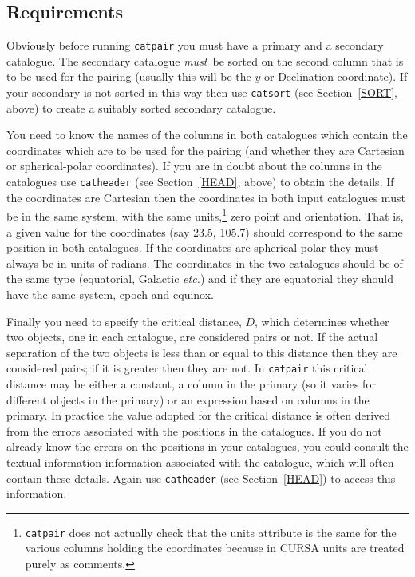 \documentclass[twoside,11pt]{starlink}
\begin{document}
\subsection{Requirements}

Obviously before running \texttt{catpair} you must have a primary and a
secondary catalogue. The secondary catalogue \textit{must}\, be sorted on
the second column that is to be used for the pairing (usually this will
be the $y$ or Declination coordinate). If your secondary is not sorted
in this way then use \texttt{catsort} (see Section~\ref{SORT}, above) to
create a suitably sorted secondary catalogue.

You need to know the names of the columns in both catalogues which
contain the coordinates which are to be used for the pairing (and whether
they are Cartesian or spherical-polar coordinates). If you are in doubt
about the columns in the catalogues use \texttt{catheader} (see
Section~\ref{HEAD}, above) to obtain the details. If the coordinates
are Cartesian then the coordinates in both input catalogues must be in
the same system, with the same units,\footnote{\texttt{catpair} does not
actually check that the units attribute is the same for the various
columns holding the coordinates because in CURSA units are treated
purely as comments.} zero point and orientation. That is, a given value
for the coordinates (say 23.5, 105.7) should correspond to the same
position in both catalogues. If the coordinates are spherical-polar
they must always be in units of radians. The coordinates in the two
catalogues should be of the same type (equatorial, Galactic \emph{etc.}\/)
and if they are equatorial they should have the same system, epoch and
equinox.

Finally you need to specify the critical distance, $D$, which determines
whether two objects, one in each catalogue, are considered pairs or not.
If the actual separation of the two objects is less than or equal to
this distance then they are considered pairs; if it is greater then they
are not. In \texttt{catpair} this critical distance may be either a
constant, a column in the primary (so it varies for different objects in
the primary) or an expression based on columns in the primary. In
practice the value adopted for the critical distance is often derived
from the errors associated with the positions in the catalogues. If
you do not already know the errors on the positions in your catalogues,
you could consult the textual information information associated with
the catalogue, which will often contain these details. Again use \texttt{catheader} (see Section~\ref{HEAD}) to access this information.
\end{document}
